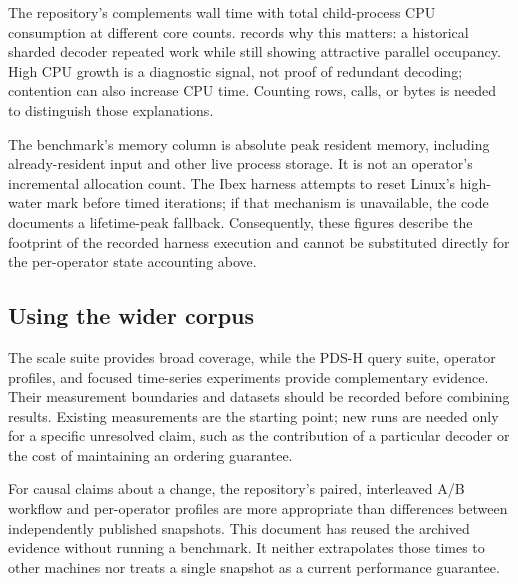 The repository's  complements wall
time with total child-process CPU consumption at different core counts.
 records why this matters: a historical sharded decoder
repeated work while still showing attractive parallel occupancy. High CPU
growth is a diagnostic signal, not proof of redundant decoding; contention
can also increase CPU time. Counting rows, calls, or bytes is needed to
distinguish those explanations.

The benchmark's memory column is absolute peak resident memory, including
already-resident input and other live process storage. It is not an
operator's incremental allocation count. The Ibex harness attempts to reset
Linux's high-water mark before timed iterations; if that mechanism is
unavailable, the code documents a lifetime-peak fallback. Consequently, these
figures describe the footprint of the recorded harness execution and cannot
be substituted directly for the per-operator state accounting above.


\subsection{Using the wider corpus}
The scale suite provides broad coverage, while the PDS-H query suite,
operator profiles, and focused time-series experiments provide complementary
evidence. Their measurement boundaries and datasets should be recorded before
combining results. Existing measurements are the starting point; new runs are
needed only for a specific unresolved claim, such as the contribution of a
particular decoder or the cost of maintaining an ordering guarantee.

For causal claims about a change, the repository's paired, interleaved A/B
workflow and per-operator profiles are more appropriate than differences
between independently published snapshots. This document has reused the
archived evidence without running a benchmark. It neither extrapolates those
times to other machines nor treats a single snapshot as a current performance
guarantee.
